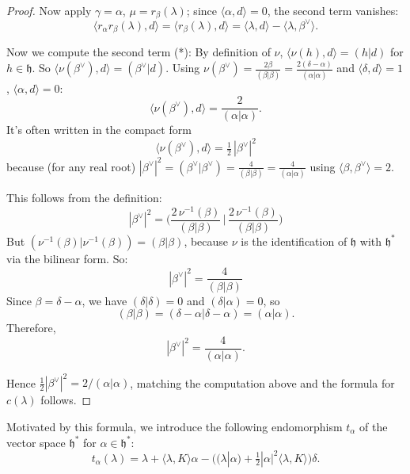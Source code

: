 \documentclass[12pt]{article}
\begin{document}
\begin{proof}
    Now apply $\gamma=\alpha$, $\mu=r_\beta(\lambda)$; since $\langle\alpha,d\rangle=0$, the second term vanishes:
    \[
        \langle r_\alpha r_\beta(\lambda),d\rangle = \langle r_\beta(\lambda),d\rangle = \langle\lambda,d\rangle-\langle\lambda,\beta^\vee\rangle.
    \]

    Now we compute the second term (*): By definition of $\nu$, $\langle\nu(h),d\rangle=(h|d)$ for $h\in\mathfrak h$. So
    $\langle\nu(\beta^\vee),d\rangle=(\beta^\vee|d)$. Using $\nu(\beta^\vee)=\frac{2\beta}{(\beta|\beta)}=\frac{2(\delta-\alpha)}{(\alpha|\alpha)}$ and $\langle\delta,d\rangle=1$, $\langle\alpha,d\rangle=0$:
    \[
        \langle\nu(\beta^\vee),d\rangle=\frac{2}{(\alpha|\alpha)}.
    \]
    It's often written in the compact form
    \[
        \langle\nu(\beta^\vee),d\rangle=\tfrac12\,|\beta^\vee|^2
    \]
    because (for any real root) $|\beta^\vee|^2=(\beta^\vee|\beta^\vee)=\frac{4}{(\beta|\beta)}=\frac{4}{(\alpha|\alpha)}$ using $\langle\beta,\beta^\vee\rangle=2$.

    This follows from the definition:
    \[
        |\beta^\vee|^2 = \Big(\frac{2\,\nu^{-1}(\beta)}{(\beta|\beta)} \,\Big|\, \frac{2\,\nu^{-1}(\beta)}{(\beta|\beta)}\Big)
    \]
    But $(\nu^{-1}(\beta)|\nu^{-1}(\beta)) = (\beta|\beta)$, because $\nu$ is the identification of $\mathfrak{h}$ with $\mathfrak{h}^*$ via the bilinear form. So:
    \[
        |\beta^\vee|^2 = \frac{4}{(\beta|\beta)}
    \]
    Since $\beta = \delta - \alpha$, we have $(\delta|\delta)=0$ and $(\delta|\alpha)=0$, so
    \[
        (\beta|\beta) = (\delta-\alpha|\delta-\alpha) = (\alpha|\alpha).
    \]
    Therefore,
    \[
        |\beta^\vee|^2 = \frac{4}{(\alpha|\alpha)}.
    \]

    Hence $\frac{1}{2}|\beta^\vee|^2=2/(\alpha|\alpha)$, matching the computation above and the formula for $c(\lambda)$ follows.
\end{proof}

Motivated by this formula, we introduce the following endomorphism
$t_\alpha$ of the vector space $\mathfrak{h}^*$ for $\alpha \in \mathfrak{h}^*$:
\begin{equation}\label{eq:ta}
    t_\alpha(\lambda)
    = \lambda + \langle \lambda, K \rangle \alpha
    - \big( (\lambda|\alpha)
    + \tfrac{1}{2}|\alpha|^2 \langle \lambda, K \rangle \big)\delta.
\end{equation}
\end{document}
